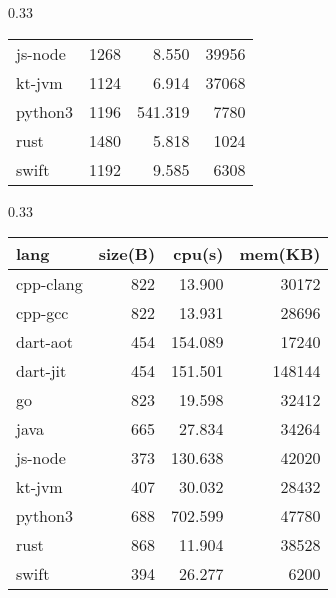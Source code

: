 \begin{table*}[htbp]
\begin{subtable}[h]{0.33\linewidth}
\begin{tabular}{lrrr}
            js-node   & 1268    & 8.550   & 39956   \\
            kt-jvm    & 1124    & 6.914   & 37068   \\
            python3   & 1196    & 541.319 & 7780    \\
            rust      & 1480    & 5.818   & 1024    \\
            swift     & 1192    & 9.585   & 6308    \\
            \bottomrule
        \end{tabular}
    \end{subtable}
    \begin{subtable}[h]{0.33\linewidth}
        \centering
        \caption{Comprehensive test}
        \label{tab:mandelbrot}
        \begin{tabular}{lrrr}
            \toprule
            lang      & size(B) & cpu(s)  & mem(KB) \\
            \midrule
            cpp-clang & 822     & 13.900  & 30172   \\
            cpp-gcc   & 822     & 13.931  & 28696   \\
            dart-aot  & 454     & 154.089 & 17240   \\
            dart-jit  & 454     & 151.501 & 148144  \\
            go        & 823     & 19.598  & 32412   \\
            java      & 665     & 27.834  & 34264   \\
            js-node   & 373     & 130.638 & 42020   \\
            kt-jvm    & 407     & 30.032  & 28432   \\
            python3   & 688     & 702.599 & 47780   \\
            rust      & 868     & 11.904  & 38528   \\
            swift     & 394     & 26.277  & 6200    \\
            \bottomrule
        \end{tabular}
    \end{subtable}
\end{table*}
